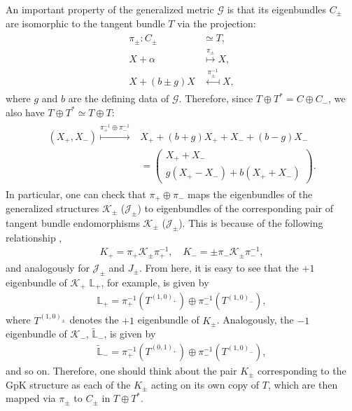 \documentclass[letterpaper,12pt]{article}
\newcommand{\TT}{{T\oplus T^*}}
\newcommand{\JJ}{\mathcal{J}}
\newcommand{\KK}{\mathcal{K}}
\newcommand{\GG}{\mathcal{G}}
\newcommand{\ap}{\alpha}
\newcommand{\Lb}{\mathbb{L}}
\theoremstyle{definition}
\theoremstyle{remark}
\theoremstyle{examples}
\begin{document}
An important property of the generalized metric $\GG$ is that its  eigenbundles $C_\pm$ are isomorphic to the tangent bundle $T$ via the projection:
\begin{align}\label{pi_iso}
\begin{aligned}
\pi_\pm:C_\pm &\simeq T,\\
X+\ap &\overset{\pi_\pm}{\longmapsto} X,\\
X+(b\pm g)X &\overset{\pi^{-1}_\pm}{\longmapsfrom} X,
\end{aligned}
\end{align}
where $g$ and $b$ are the defining data of $\GG$. Therefore, since $\TT=C\oplus C_-$, we also have $\TT\simeq T\oplus T$:
\begin{align}
\begin{aligned}
(X_+,X_-)\overset{\pi^{-1}_+\oplus \pi^{-1}_-}{\longmapsto}& X_++(b+g)X_++X_-+(b-g)X_-\\
&=
\begin{pmatrix}
 X_++X_- \\
 g(X_+-X_-)+b(X_++X_-)
\end{pmatrix}.
\end{aligned}\label{map_pi_pm}
\end{align}
In particular, one can check that $\pi_+\oplus \pi_-$ maps the eigenbundles of the generalized structures $\KK_\pm$ ($\JJ_\pm$) to eigenbundles of the corresponding pair of tangent bundle endomorphisms $\KK_\pm$ ($\JJ_\pm$). This is because of the following relationship \cite{Hu:2019zro},
\begin{align*}
K_+=\pi_+\KK_\pm\pi_+^{-1},\quad K_-=\pm\pi_-\KK_\pm\pi_-^{-1},
\end{align*}
and analogously for $\JJ_\pm$ and $J_\pm$. From here, it is easy to see that the $+1$ eigenbundle of $\KK_+$ $\Lb_+$, for example, is given by
\begin{align*}
\Lb_+=\pi_+^{-1}(T^{(1,0)_+})\oplus\pi_-^{-1}(T^{(1,0)_-}),
\end{align*}
where $T^{(1,0)_\pm}$ denotes the $+1$ eigenbundle of $K_\pm$. Analogously, the $-1$ eigenbundle of $\KK_-$,
$\widetilde{\Lb}_-$, is given by
\begin{align*}
\widetilde{\Lb}_-=\pi_+^{-1}(T^{(0,1)_+})\oplus\pi_-^{-1}(T^{(1,0)_-}),
\end{align*}
and so on. Therefore, one should think about the pair $K_\pm$ corresponding to the GpK structure as each of the $K_\pm$ acting on its own copy of $T$, which are then mapped via $\pi_\pm$ to $C_\pm$ in $\TT$.
\end{document}
